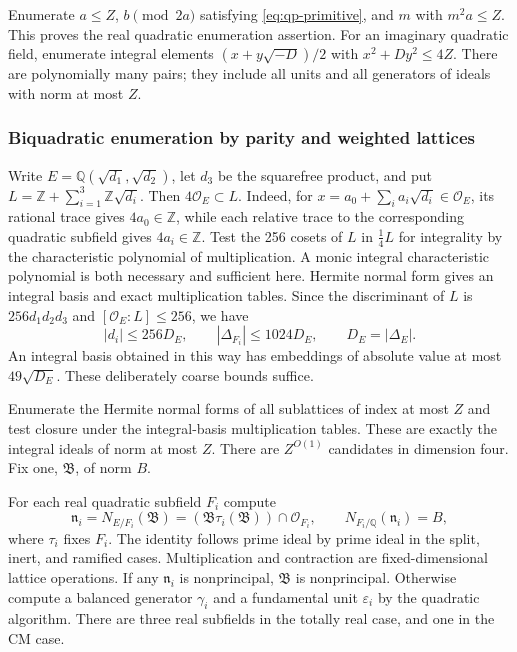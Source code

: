 Enumerate $a\leq Z$, $b\pmod{2a}$ satisfying
\eqref{eq:qp-primitive}, and $m$ with $m^2a\leq Z$.  This proves the
real quadratic enumeration assertion.  For an imaginary quadratic field,
enumerate integral elements $(x+y\sqrt{-D})/2$ with
$x^2+Dy^2\leq4Z$.  There are polynomially many pairs; they include all
units and all generators of ideals with norm at most $Z$.

\subsubsection{Biquadratic enumeration by parity and weighted lattices}

Write $E=\mathbb Q(\sqrt{d_1},\sqrt{d_2})$, let $d_3$ be the
squarefree product, and put
$L=\mathbb Z+\sum_{i=1}^3\mathbb Z\sqrt{d_i}$.
Then $4\mathcal O_E\subset L$.  Indeed, for
$x=a_0+\sum_i a_i\sqrt{d_i}\in\mathcal O_E$, its rational trace
gives $4a_0\in\mathbb Z$, while each relative trace to the corresponding
quadratic subfield gives $4a_i\in\mathbb Z$.
Test the 256 cosets of $L$ in $\frac14L$ for integrality by the
characteristic polynomial of multiplication.  A monic integral
characteristic polynomial is both necessary and sufficient here.
Hermite normal form gives an integral basis and exact multiplication
tables.  Since the discriminant of $L$ is $256d_1d_2d_3$ and
$[\mathcal O_E:L]\leq256$, we have
\[
 |d_i|\leq256D_E,\qquad |\Delta_{F_i}|\leq1024D_E,
 \qquad D_E=|\Delta_E|.
\]
An integral basis obtained in this way has embeddings of absolute value
at most $49\sqrt{D_E}$.  These deliberately coarse bounds suffice.

Enumerate the Hermite normal forms of all sublattices of index at most
$Z$ and test closure under the integral-basis multiplication tables.
These are exactly the integral ideals of norm at most $Z$.
There are $Z^{O(1)}$ candidates in dimension four.  Fix one,
$\mathfrak B$, of norm $B$.

For each real quadratic subfield $F_i$ compute
\[
 \mathfrak n_i=N_{E/F_i}(\mathfrak B)
   =(\mathfrak B\tau_i(\mathfrak B))\cap\mathcal O_{F_i},
 \qquad N_{F_i/\mathbb Q}(\mathfrak n_i)=B,
\]
where $\tau_i$ fixes $F_i$.  The identity follows prime ideal by prime
ideal in the split, inert, and ramified cases.  Multiplication and
contraction are fixed-dimensional lattice operations.  If any
$\mathfrak n_i$ is nonprincipal, $\mathfrak B$ is nonprincipal.
Otherwise compute a balanced generator $\gamma_i$ and a fundamental
unit $\varepsilon_i$ by the quadratic algorithm.  There are three real
subfields in the totally real case, and one in the CM case.

